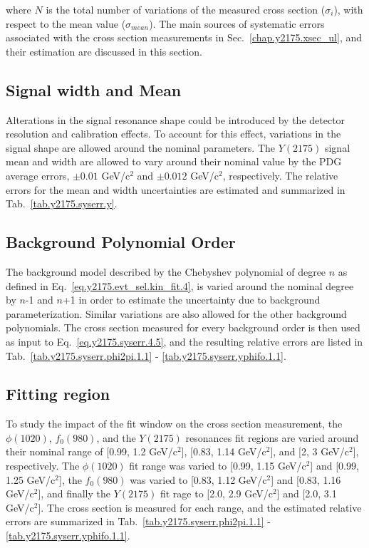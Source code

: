 \noindent where $N$ is the total number of variations of the measured cross section ($\sigma_{i}$), with respect to the mean value ($\sigma_{mean}$). The main sources of systematic errors associated with the cross section measurements in Sec.~\ref{chap.y2175.xsec_ul}, and their estimation are discussed in this section.

\subsection{Signal width and Mean}
\label{chap.y2175.syserr.sig}

Alterations in the signal resonance shape could be introduced by the detector resolution and calibration effects. To account for this effect, variations in the signal shape are allowed around the nominal parameters. The $Y(2175)$ signal mean and width are allowed to vary around their nominal value by the PDG average errors, $\pm 0.01$ GeV/c$^2$ and $\pm 0.012$ GeV/c$^2$, respectively. The relative errors for the mean and width uncertainties are estimated and summarized in Tab.~\ref{tab.y2175.syserr.y}.

\subsection{Background Polynomial Order}
\label{chap.y2175.syserr.bkg}

The background model described by the Chebyshev polynomial of degree $n$ as defined in Eq.~\ref{eq.y2175.evt_sel.kin_fit.4}, is varied around the nominal degree by $n$-1 and $n$+1 in order to estimate the uncertainty due to background parameterization. Similar variations are also allowed for the other background polynomials. The cross section measured for every background order is then used as input to Eq.~\ref{eq.y2175.syserr.4.5}, and the resulting relative errors are listed in Tab.~\ref{tab.y2175.syserr.phi2pi.1.1} - \ref{tab.y2175.syserr.yphifo.1.1}.

\subsection{Fitting region}
\label{chap.y2175.syserr.range}

To study the impact of the fit window on the cross section measurement, the $\phi(1020)$, $f_{0}(980)$, and the $Y(2175)$  resonances fit regions are varied around their nominal range of [0.99, 1.2 GeV/c$^2$], [0.83, 1.14 GeV/c$^2$], and [2, 3 GeV/c$^2$], respectively. The $\phi(1020)$ fit range was varied to [0.99, 1.15 GeV/c$^2$] and [0.99, 1.25 GeV/c$^2$], the $f_{0}(980)$ was varied to [0.83, 1.12 GeV/c$^2$] and [0.83, 1.16 GeV/c$^2$], and finally the $Y(2175)$ fit rage to [2.0, 2.9 GeV/c$^2$] and [2.0, 3.1 GeV/c$^2$]. The cross section is measured for each range, and the estimated relative errors are summarized in Tab.~\ref{tab.y2175.syserr.phi2pi.1.1} - \ref{tab.y2175.syserr.yphifo.1.1}.

